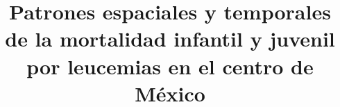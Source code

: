 \documentclass[11pt, oneside]{book}
\begin{document}
\renewcommand{\bibname}{Referencias}





\renewcommand{\proofname}{Demostración}
\providecommand{\norm}[1]{\lVert#1\rVert} %
\providecommand{\innp}[1]{\langle#1\rangle} 
\newcommand{\seno}{\mathrm{sen}}
\newcommand{\diff}{\mathrm{d}}

\newtheorem{teo}{Teorema}[section] 
\newtheorem{cor}[teo]{Corolario}
\newtheorem{lem}[teo]{Lema}

\theoremstyle{definition}
\newtheorem{dfn}[teo]{Definición}

\theoremstyle{remark}
\newtheorem{obs}[teo]{Observación}

\allowdisplaybreaks



\title{Patrones espaciales y temporales de la mortalidad infantil y juvenil por leucemias en el centro de México} %
\end{document}

